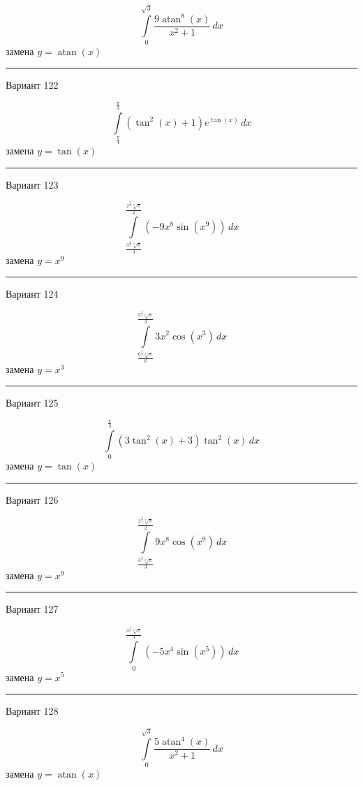 \documentclass[11pt]{report}
\begin{document}
$$\int\limits_{0}^{\sqrt{3}} \frac{9 \operatorname{atan}^{8}{\left(x \right)}}{x^{2} + 1}\, dx$$
замена $y = \operatorname{atan}{\left(x \right)}$



\rule{\textwidth}{.2mm}

Вариант 122

$$\int\limits_{\frac{\pi}{4}}^{\frac{\pi}{3}} \left(\tan^{2}{\left(x \right)} + 1\right) e^{\tan{\left(x \right)}}\, dx$$
замена $y = \tan{\left(x \right)}$



\rule{\textwidth}{.2mm}

Вариант 123

$$\int\limits_{\frac{3^{\frac{8}{9}} \sqrt[9]{\pi}}{3}}^{\frac{2^{\frac{8}{9}} \sqrt[9]{\pi}}{2}} \left(- 9 x^{8} \sin{\left(x^{9} \right)}\right)\, dx$$
замена $y = x^{9}$



\rule{\textwidth}{.2mm}

Вариант 124

$$\int\limits_{\frac{6^{\frac{2}{3}} \sqrt[3]{\pi}}{6}}^{\frac{3^{\frac{2}{3}} \sqrt[3]{\pi}}{3}} 3 x^{2} \cos{\left(x^{3} \right)}\, dx$$
замена $y = x^{3}$



\rule{\textwidth}{.2mm}

Вариант 125

$$\int\limits_{0}^{\frac{\pi}{3}} \left(3 \tan^{2}{\left(x \right)} + 3\right) \tan^{2}{\left(x \right)}\, dx$$
замена $y = \tan{\left(x \right)}$



\rule{\textwidth}{.2mm}

Вариант 126

$$\int\limits_{\frac{3^{\frac{8}{9}} \sqrt[9]{\pi}}{3}}^{\frac{2^{\frac{8}{9}} \sqrt[9]{\pi}}{2}} 9 x^{8} \cos{\left(x^{9} \right)}\, dx$$
замена $y = x^{9}$



\rule{\textwidth}{.2mm}

Вариант 127

$$\int\limits_{0}^{\frac{3^{\frac{4}{5}} \sqrt[5]{\pi}}{3}} \left(- 5 x^{4} \sin{\left(x^{5} \right)}\right)\, dx$$
замена $y = x^{5}$



\rule{\textwidth}{.2mm}

Вариант 128

$$\int\limits_{0}^{\sqrt{3}} \frac{5 \operatorname{atan}^{4}{\left(x \right)}}{x^{2} + 1}\, dx$$
замена $y = \operatorname{atan}{\left(x \right)}$
\end{document}
